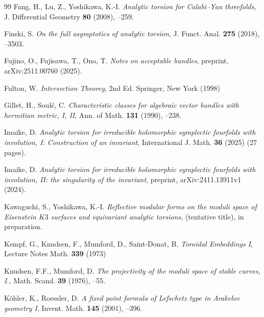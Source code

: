 \documentclass[amscd, leqno]{amsart}
\theoremstyle{plain}
\theoremstyle{definition}
\theoremstyle{remark}
\begin{document}
\begin{thebibliography}{99}
Fang, H., Lu, Z., Yoshikawa, K.-I.
\newblock 
\textit{Analytic torsion for Calabi--Yau threefolds},
\newblock 
J. Differential Geometry
\newblock
{\bf 80}
\newblock
(2008),
--259.


Finski, S.
\newblock 
\textit{On the full asymptotics of analytic torsion},
\newblock 
J. Funct. Anal.
\newblock 
{\bf 275}
\newblock 
(2018),
--3503.


Fujino, O., Fujisawa, T., Ono, T.
\newblock
\textit{Notes on acceptable bundles},
\newblock
preprint,
\newblock
arXiv:2511.00760
\newblock
(2025).


Fulton, W.
\newblock
\textit{Intersection Theorey},
\newblock
2nd Ed.
\newblock
Springer,
\newblock
New York
\newblock
(1998)


Gillet, H., Soul\'e, C.
\newblock
\textit{Characteristic classes for algebraic vector bundles with hermitian metric, I, II},
\newblock
Ann. of Math.
\newblock
{\bf 131}
\newblock
(1990),
--238.


Imaike, D.
\newblock
\textit{Analytic torsion for irreducible holomorphic symplectic fourfolds with involution, I: Construction of an invariant},
\newblock
International J. Math.
\newblock
{\bf 36}
\newblock
(2025)
 (27 pages). 


Imaike, D.
\newblock
\textit{Analytic torsion for irreducible holomorphic symplectic fourfolds with involution, II: the singularity of the invariant},
\newblock
preprint,
\newblock
arXiv:2411.13911v1
\newblock
(2024). 


Kawaguchi, S., Yoshikawa, K.-I.
\newblock
\textit{Reflective modular forms on the moduli space of Eisenstein $K3$ surfaces and equivariant analytic torsions},
\newblock
(tentative title),
\newblock
in preparation.


Kempf, G., Knudsen, F., Mumford, D., Saint-Donat, B.
\newblock
\textit{Toroidal Embeddings I},
\newblock 
Lecture Notes Math. 
\newblock 
{\bf 339}  
\newblock 
(1973)


Knudsen, F.F., Mumford, D.
\newblock 
\textit{The projectivity of the moduli space of stable curves, I.},
\newblock 
Math. Scand.
\newblock 
{\bf 39}
\newblock 
(1976),
--55.


K\"ohler, K., Roessler, D.
\newblock
\textit{A fixed point formula of Lefschetz type in Arakelov geometry I},
\newblock 
Invent. Math.
\newblock
{\bf 145}
\newblock 
(2001),
--396.



\end{thebibliography}
\end{document}
